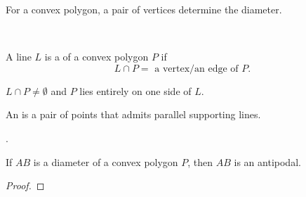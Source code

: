 \begin{frame}{}
  \begin{theorem}
    For a convex polygon, a pair of vertices determine the diameter.
  \end{theorem}

  \pause

  \pause
  \vspace{0.30cm}
  \begin{center}
     \\[10pt] \pause
  \end{center}
\end{frame}

\begin{frame}{}
  \begin{definition}
    A line $L$ is a  of a convex polygon $P$ if
    \[
      L \cap P = \text{ a vertex/an edge of } P.
    \]
  \end{definition}
  \pause
  \vspace{0.20cm}
  \centerline{$L \cap P \neq \emptyset$ and $P$ lies entirely on one side of $L$.}

  \pause
  \vspace{0.50cm}
  \begin{definition}[Antipodal]
    An  is a pair of points that admits parallel supporting lines.
  \end{definition}

  \pause
  \vspace{0.60cm}
  \centerline{.}
\end{frame}

\begin{frame}{}
  \begin{theorem}[]
    If $AB$ is a diameter of a convex polygon $P$, then $AB$ is an antipodal.
  \end{theorem}

  \pause
  \vspace{0.50cm}
  \begin{proof}
    \pause
  \end{proof}
\end{frame}

